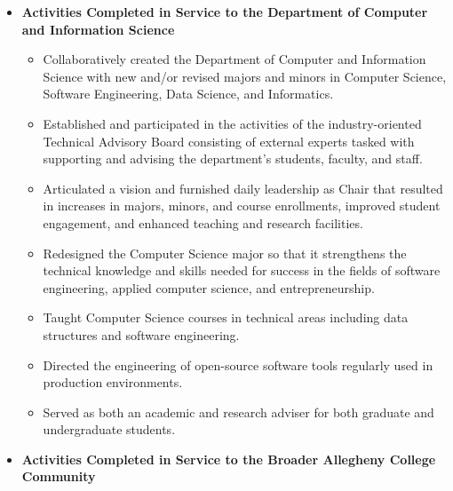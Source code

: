 \documentclass[11pt,letterpaper,sans]{moderncv}
\begin{document}
 {
  \begin{itemize} \renewcommand\labelitemi{\Large\textbullet}
    \item \textbf{Activities Completed in Service to the Department of Computer
      and Information Science}
      \begin{itemize} \renewcommand\labelitemi{\Large\textbullet}
        \item Collaboratively created the Department of Computer and
          Information Science with new and/or revised majors and minors in
          Computer Science, Software Engineering, Data Science, and
          Informatics.
        \item Established and participated in the activities of the
          industry-oriented Technical Advisory Board consisting of external
          experts tasked with supporting and advising the department's
          students, faculty, and staff.
        \item Articulated a vision and furnished daily leadership as Chair that
          resulted in increases in majors, minors, and course enrollments,
          improved student engagement, and enhanced teaching and research
          facilities.
        \item Redesigned the Computer Science major so that it strengthens the
          technical knowledge and skills needed for success in the fields of
          software engineering, applied computer science, and entrepreneurship.
        \item Taught Computer Science courses in technical areas including data
          structures and software engineering.
        \item Directed the engineering of open-source software tools regularly
          used in production environments.
        \item Served as both an academic and research adviser for both graduate
          and undergraduate students.
      \end{itemize}
    \item \textbf{Activities Completed in Service to the Broader Allegheny
      College Community}
      \begin{itemize} \renewcommand\labelitemi{\Large\textbullet}

\end{itemize}
\end{itemize}}
\end{document}

